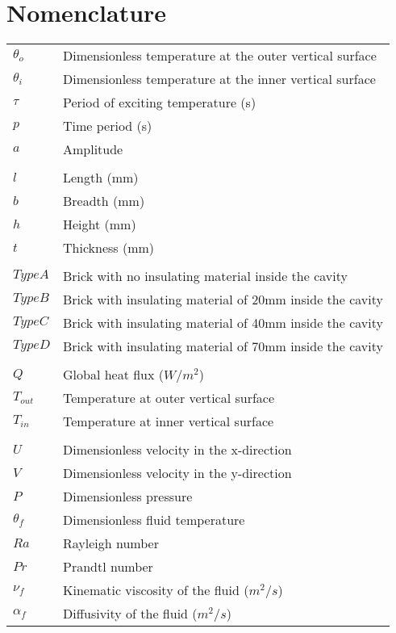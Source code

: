 \documentclass{article}
\begin{document}
%



\section*{\LARGE{Nomenclature}}
\vspace{2cm}
\begin{tabular}{ll}

$\theta_o$ & Dimensionless temperature at the outer vertical surface\\
$\theta_i$ & Dimensionless temperature at the inner vertical surface\\
$\tau$ & Period of exciting temperature (s)\\
$p$ & Time period (s)\\
$a$ & Amplitude\\
 & \\
$l$ & Length (mm)\\
$b$ & Breadth (mm)\\
$h$ & Height (mm)\\
$t$ & Thickness (mm)\\
 & \\
$Type A$ & Brick with no insulating material inside the cavity\\
$Type B$ & Brick with insulating material of 20mm inside the cavity\\
$Type C$ & Brick with insulating material of 40mm inside the cavity\\
$Type D$ & Brick with insulating material of 70mm inside the cavity\\
 & \\  
$Q$ & Global heat flux ($W/m^{2}$)\\
$T_{out}$ & Temperature at outer vertical surface \\
$T_{in}$ & Temperature at inner vertical surface \\
 & \\
$U$ & Dimensionless velocity in the x-direction \\
$V$ & Dimensionless velocity in the y-direction\\
$P$ & Dimensionless pressure\\
$\theta_f$ & Dimensionless fluid temperature\\
$Ra$ & Rayleigh number\\
$Pr$ & Prandtl number\\
$\nu_f$ & Kinematic viscosity of the fluid ($m^2/s$) \\
$\alpha_f$ & Diffusivity of the fluid ($m^2/s$)\\



\end{tabular}
\end{document}
